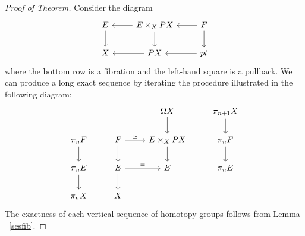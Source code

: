 \documentclass{article}
\newtheorem{proposed work}[theorem]{Proposed Work}
\begin{document}
\begin{proof}[Proof of Theorem]
Consider the diagram
\[
\begin{tikzcd}
E \arrow[d] & E \times_X PX \arrow[l] \arrow[d] & F \arrow[l] \arrow[d] \\
X  & PX \arrow[l] & pt \arrow[l]
\end{tikzcd}
\]
where the bottom row is a fibration and the left-hand square is a pullback. We can  produce a long exact sequence by iterating the procedure illustrated in the following diagram:
\[
\begin{tikzcd}
& & \Omega X  \arrow[d] & \pi_{n+1}X \arrow[d] \\
\pi_n F \arrow[d]  & F \arrow[d] \arrow[r,"\simeq"] & E \times_X PX \arrow{d} & \pi_n F \arrow[d] \\
\pi_n E \arrow[d] & E  \arrow[d] \arrow[r,"="]& E & \pi_n E \\
\pi_n X & X
\end{tikzcd}
\]
The exactness of each vertical sequence of homotopy groups follows from Lemma ~\ref{sesfib}. 
\end{proof}
\end{document}
